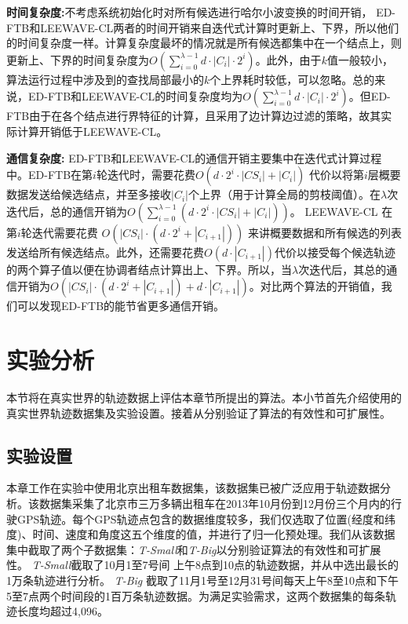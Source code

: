   \textbf{时间复杂度:}不考虑系统初始化时对所有候选进行哈尔小波变换的时间开销， ED-FTB和LEEWAVE-CL两者的时间开销来自迭代式计算时更新上、下界，所以他们的时间复杂度一样。计算复杂度最坏的情况就是所有候选都集中在一个结点上，则更新上、下界的时间复杂度为$O(\sum_{i=0}^{\lambda-1} d\cdot |C_{i}| \cdot 2^{i})$。此外，由于$k$值一般较小，算法运行过程中涉及到的查找局部最小的$k$个上界耗时较低，可以忽略。总的来说，ED-FTB和LEEWAVE-CL的时间复杂度均为$O(\sum_{i=0}^{\lambda-1} d\cdot |C_{i}| \cdot 2^{i})$。但ED-FTB由于在各个结点进行界特征的计算，且采用了边计算边过滤的策略，故其实际计算开销低于LEEWAVE-CL。
 
  \textbf{通信复杂度:}
ED-FTB和LEEWAVE-CL的通信开销主要集中在迭代式计算过程中。ED-FTB在第$i$轮迭代时，需要花费$O(d\cdot 2^{i}\cdot |CS_{i}|+|C_{i}|)$ 代价以将第$i$层概要数据发送给候选结点，并至多接收$|C_{i}|$个上界（用于计算全局的剪枝阈值）。在$\lambda$次迭代后，总的通信开销为$O(\sum_{i=0}^{\lambda-1}(d \cdot 2^{i} \cdot|CS_{i}| + |C_{i}|))$。
LEEWAVE-CL 在第$i$轮迭代需要花费 $O(|CS_{i}| \cdot (d\cdot 2^{i}+ |C_{i+1}|))$ 来讲概要数据和所有候选的列表发送给所有候选结点。此外，还需要花费$O(d\cdot |C_{i+1}|)$代价以接受每个候选轨迹的两个算子值以便在协调者结点计算出上、下界。所以，当$\lambda$次迭代后，其总的通信开销为$O(|CS_{i}| \cdot (d\cdot 2^{i}+ |C_{i+1}|)+d\cdot |C_{i+1}|)$。对比两个算法的开销值，我们可以发现ED-FTB的能节省更多通信开销。
 
 \section{实验分析}\label{sec-c4-Exp}
本节将在真实世界的轨迹数据上评估本章节所提出的算法。本小节首先介绍使用的真实世界轨迹数据集及实验设置。接着从分别验证了算法的有效性和可扩展性。

\subsection{实验设置}
本章工作在实验中使用北京出租车数据集，该数据集已被广泛应用于轨迹数据分析。该数据集采集了北京市三万多辆出租车在2013年10月份到12月份三个月内的行驶GPS轨迹。每个GPS轨迹点包含的数据维度较多，我们仅选取了位置(经度和纬度)、时间、速度和角度这五个维度的值，并进行了归一化预处理。我们从该数据集中截取了两个子数据集：\emph{T-Small}和\emph{T-Big}以分别验证算法的有效性和可扩展性。
\emph{T-Small}截取了10月1至7号间 上午8点到10点的轨迹数据，并从中选出最长的1万条轨迹进行分析。
\emph{T-Big} 截取了11月1号至12月31号间每天上午8至10点和下午5至7点两个时间段的1百万条轨迹数据。为满足实验需求，这两个数据集的每条轨迹长度均超过4,096。

